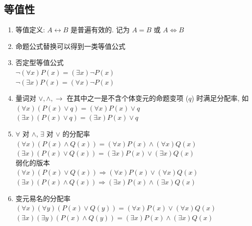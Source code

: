 \documentclass[11pt,a4paper,twocolumn,fleqn]{article} %
\begin{document}
\subsection{等值性} %
\label{sub:equ}
\begin{enumerate}
	\item 等值定义: $A\leftrightarrow B$ 是普遍有效的. 记为 $A = B$ 或
	$A\Leftrightarrow B$
	\item 命题公式替换可以得到一类等值公式
	\item 否定型等值公式\\
	$\lnot(\forall x)P(x) = (\exists x)\lnot P(x)$\\
	$\lnot(\exists x)P(x) = (\forall x)\lnot P(x)$
	\item 量词对 $\lor, \land, \to$ 在其中之一是不含个体变元的命题变项 ($q$) 
	时满足分配率, 如\\
	$(\forall x) (P(x) \lor q) = (\forall x) P(x) \lor q$ \\
	$(\exists x) (P(x) \lor q) = (\exists x) P(x) \lor q$ 
	\item $\forall $ 对 $\land$, $\exists $ 对 $\lor$ 的分配率\\
	$(\forall x)(P(x)\land Q(x)) = (\forall x)P(x)\land (\forall x)Q(x)$ \\
	$(\exists x)(P(x)\lor Q(x)) = (\exists x) P(x)\lor (\exists x)Q(x)$ \\
	弱化的版本\\
	$(\forall x)(P(x)\lor Q(x)) \Rightarrow (\forall x)P(x)\lor (\forall x)Q(x)$ \\
	$(\exists x)(P(x)\land Q(x)) \Rightarrow (\exists x) P(x)\land (\exists x)Q(x)$
	\item 变元易名的分配率\\
	$(\forall x)(\forall y)(P(x)\lor Q(y)) = (\forall x)P(x)\lor (\forall x)Q(x)$\\
	$(\exists x)(\exists y)(P(x)\land Q(y)) = (\exists x)P(x)\land (\exists x)Q(x)$
\end{enumerate}
\end{document}
